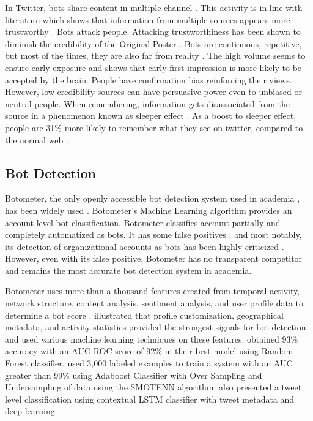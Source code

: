 \documentclass[letterpaper]{article}
\begin{document}
In Twitter, bots share content 
in multiple channel \cite{paul2016russian}. This activity is in line with literature which shows that information from multiple sources appears more trustworthy \cite{harkins1981multiple}. 
 Bots attack people. Attacking trustworthiness has been shown to diminish the credibility of the Original Poster \cite{pornpitakpan2004persuasiveness}. 
Bots are continuous, repetitive, but most of the times, they are also far from reality \cite{paul2016russian}. The high volume seems to ensure early exposure and \cite{petty1994think} shows that early
 first impression is more likely to be accepted by the brain. People have confirmation bias reinforcing their views. However, low credibility
  sources can have persuasive power even to unbiased or neutral people. When remembering, information gets disassociated from the source in a phenomenon known as sleeper effect \cite{underwood1998memory,paul2016russian}. 
As a boost to sleeper effect, people are 31\% more likely to remember what they see on twitter, compared to the normal web \cite{twitter_remember}. \par

\subsection{Bot Detection}
Botometer, the only openly accessible bot detection system used in academia \cite{davis2016botornot,yang2019arming}, has been widely used \cite{rizoiu2018debatenight,yang2019arming,shao2018spread}.
Botometer's Machine Learning algorithm provides an account-level bot classification. Botometer classifies account partially and completely automatized as bots. It has some false positives 
, and most notably, its detection of organizational accounts as bots has been highly criticized \cite{varol2017early} \cite{botometer_tweet}. However, even with its false positive, 
Botometer has no transparent competitor and 
remains the most accurate bot detection system in academia. \par

Botometer uses more than a thousand features created from temporal activity, network structure, content analysis, sentiment analysis, and user profile data to
determine a bot score \cite{davis2016botornot,yang2019arming}. \cite{bessi2016social} illustrated that profile customization, geographical metadata, and activity statistics provided the strongest signals for bot detection. \cite{ferrara2017disinformation} and \cite{kudugunta2018deep} used various machine learning techniques on these features. \cite{ferrara2017disinformation}
obtained 93\% accuracy with an AUC-ROC score of 92\% in their best model using Random Forest classifier. \cite{kudugunta2018deep} used 3,000 labeled examples to train a system with an AUC greater than 99\%
using Adaboost Classifier with Over Sampling and Undersampling of data using the SMOTENN algorithm. \cite{kudugunta2018deep} also presented a tweet level classification using contextual LSTM
classifier with tweet metadata and deep learning. \par
\end{document}
